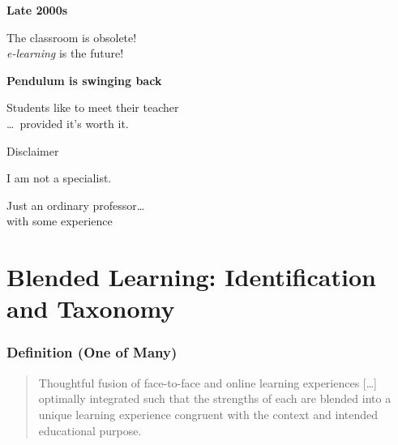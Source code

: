 \begin{frame}
  \begin{center}
    \textbf{Late 2000s}
  \end{center}
  \begin{center}
    The classroom is obsolete! \\
    \emph{e-learning} is the future!
  \end{center}
\end{frame}

\begin{frame}
  \begin{center}
    \textbf{Pendulum is swinging back}
  \end{center}
  \begin{center}
    Students like to meet their teacher \\
    \pause
    \dots\ provided it's worth it.
  \end{center}
\end{frame}

\begin{frame}[standout]
  Disclaimer \\
  \bigskip

  I am not a specialist.

  Just an ordinary professor\dots \\
  with some experience
\end{frame}

\section{Blended Learning: Identification and Taxonomy}

\begin{frame}
  \frametitle{Definition (One of Many)}

  \begin{quote}
    Thoughtful fusion of face-to-face and online learning experiences
    [\dots] optimally integrated such that \alert{the strengths of
      each} are blended into a unique learning experience congruent
    with the context and intended educational purpose.
    \citep{Garrison:blended:2007}
  \end{quote}
\end{frame}

